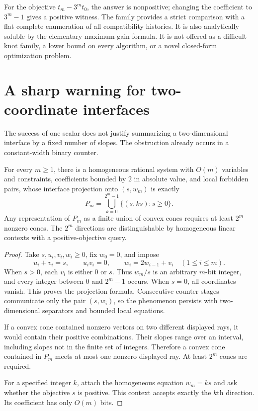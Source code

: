 For the objective $t_m-3^m t_0$, the answer is nonpositive; changing the
coefficient to $3^m-1$ gives a positive witness. The family provides a strict
comparison with a flat complete enumeration of all compatibility histories.
It is also analytically soluble by the elementary maximum-gain formula. It is
not offered as a difficult knot family, a lower bound on every algorithm, or a
novel closed-form optimization problem.

\section{A sharp warning for two-coordinate interfaces}
\label{sec:twoport}

The success of one scalar does not justify summarizing a two-dimensional
interface by a fixed number of slopes. The obstruction already occurs in a
constant-width binary counter.

\begin{theorem}
\label{thm:twoport}
For every $m\geq1$, there is a homogeneous rational system with $O(m)$ variables
and constraints, coefficients bounded by $2$ in absolute value, and local
forbidden pairs, whose interface projection onto $(s,w_m)$ is exactly
\[
 P_m=\bigcup_{k=0}^{2^m-1}\{(s,ks):s\geq0\}.
\]
Any representation of $P_m$ as a finite union of convex cones requires at least
$2^m$ nonzero cones. The $2^m$ directions are distinguishable by homogeneous
linear contexts with a positive-objective query.
\end{theorem}

\begin{proof}
Take $s,u_i,v_i,w_i\geq0$, fix $w_0=0$, and impose
\[
 u_i+v_i=s,\qquad u_iv_i=0,\qquad w_i=2w_{i-1}+v_i
 \quad(1\leq i\leq m).
\]
When $s>0$, each $v_i$ is either $0$ or $s$. Thus $w_m/s$ is an arbitrary
$m$-bit integer, and every integer between $0$ and $2^m-1$ occurs. When $s=0$,
all coordinates vanish. This proves the projection formula. Consecutive
counter stages communicate only the pair $(s,w_i)$, so the phenomenon persists
with two-dimensional separators and bounded local equations.

If a convex cone contained nonzero vectors on two different displayed rays,
it would contain their positive combinations. Their slopes range over an
interval, including slopes not in the finite set of integers. Therefore a
convex cone contained in $P_m$ meets at most one nonzero displayed ray. At least
$2^m$ cones are required.

For a specified integer $k$, attach the homogeneous equation $w_m=ks$ and
ask whether the objective $s$ is positive. This context accepts exactly the
$k$th direction. Its coefficient has only $O(m)$ bits.
\end{proof}

